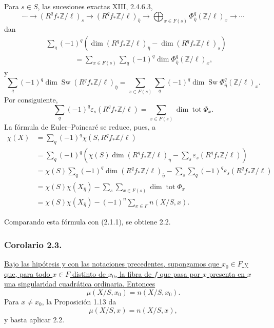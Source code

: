 Para $s\in S$, las sucesiones exactas XIII, 2.4.6.3,
\[
\cdots\longrightarrow(R^qf_*\mathbb Z/\ell)_s
\longrightarrow(R^qf_*\mathbb Z/\ell)_{\bar\eta}
\longrightarrow\bigoplus_{x\in F(s)}
\Phi^q_{\bar\eta}(\mathbb Z/\ell)_x
\longrightarrow\cdots
\]
dan
\begin{equation}\tag{a}
\begin{aligned}
&\sum_q(-1)^q\left(
\dim(R^qf_*\mathbb Z/\ell)_{\bar\eta}
-\dim(R^qf_*\mathbb Z/\ell)_s\right)\\
&\hspace{4em}=\sum_{x\in F(s)}\sum_q(-1)^q
\dim\Phi^q_{\bar\eta}(\mathbb Z/\ell)_x,
\end{aligned}
\end{equation}
y
\begin{equation}\tag{b}
\sum_q(-1)^q\dim\operatorname{Sw}
(R^qf_*\mathbb Z/\ell)_{\bar\eta}
=\sum_{x\in F(s)}\sum_q(-1)^q
\dim\operatorname{Sw}\Phi^q_{\bar\eta}(\mathbb Z/\ell)_x.
\end{equation}
Por consiguiente,
\begin{equation}\tag{c}
\sum_q(-1)^q\varepsilon_s(R^qf_*\mathbb Z/\ell)
=\sum_{x\in F(s)}\dim\operatorname{tot}\Phi_x.
\end{equation}
La fórmula de Euler--Poincaré se reduce, pues, a
\begin{align*}
\chi(X)
&=\sum_q(-1)^q\chi(S,R^qf_*\mathbb Z/\ell)\\
&=\sum_q(-1)^q\left(
\chi(S)\dim(R^qf_*\mathbb Z/\ell)_{\bar\eta}
-\sum_s\varepsilon_s(R^qf_*\mathbb Z/\ell)\right)\\
&=\chi(S)\sum_q(-1)^q
\dim(R^qf_*\mathbb Z/\ell)_{\bar\eta}
-\sum_s\sum_q(-1)^q\varepsilon_s(R^qf_*\mathbb Z/\ell)\\
&=\chi(S)\chi(X_{\bar\eta})
-\sum_s\sum_{x\in F(s)}\dim\operatorname{tot}\Phi_x\\
&=\chi(S)\chi(X_{\bar\eta})
-(-1)^n\sum_{x\in F}n(X/S,x).
\end{align*}

\pageoriginale

Comparando esta fórmula con (2.1.1), se obtiene 2.2.

\subsubsection*{Corolario 2.3.}
\underline{Bajo las hipótesis y con las notaciones precedentes,
supongamos que $x_0\in F$ y que, para todo $x\in F$ distinto de
$x_0$, la fibra de $f$ que pasa por $x$ presenta en $x$ una
singularidad cuadrática ordinaria. Entonces}
\[
\mu(X/S,x_0)=n(X/S,x_0).
\]
Para $x\ne x_0$, la Proposición 1.13 da
\[
\mu(X/S,x)=n(X/S,x),
\]
y basta aplicar 2.2.

